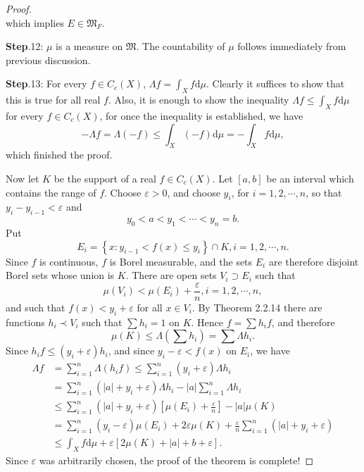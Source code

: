 \begin{proof}
$$$$
which implies $E\in\mathfrak{M}_F$.\par
\textbf{Step}.12: $\mu$ is a measure on $\mathfrak{M}$. The countability of $\mu$ follows immediately from previous discussion.\par
\textbf{Step}.13: For every $f\in C_c(X)$, $\Lambda f=\int_Xf\mathrm{d}\mu$. Clearly it suffices to show that this is true for all real $f$. Also, it is enough to show the inequality $\Lambda f\le\int_Xf\mathrm{d}\mu$ for every $f\in C_c(X)$, for once the inequality is established, we have 
$$
-\Lambda f=\Lambda \left( -f \right) \le \int_X{\left( -f \right) \mathrm{d}\mu}=-\int_X{f\mathrm{d}\mu},
$$
which finished the proof.\par
Now let $K$ be the support of a real $f\in C_c(X)$. Let $[a,b]$ be an interval which contains the range of $f$. Choose $\varepsilon>0$, and choose $y_i$, for $i=1,2,\cdots,n$, so that $y_i-y_{i-1}<\varepsilon$ and 
$$
y_0<a<y_1<\cdots <y_n=b.
$$
Put 
$$
E_i=\left\{ x:y_{i-1}<f\left( x \right) \le y_i \right\} \cap K,i=1,2,\cdots ,n.
$$
Since $f$ is continuous, $f$ is Borel measurable, and the sets $E_i$ are therefore disjoint Borel sets whose union is $K$. There are open sets $V_i\supset E_i$ such that 
$$
\mu \left( V_i \right) <\mu \left( E_i \right) +\frac{\varepsilon}{n},i=1,2,\cdots ,n,
$$
and such that $f(x)<y_i+\varepsilon$ for all $x\in V_i$. By Theorem 2.2.14 there are functions $h_i\prec V_i$ such that $\sum h_i=1$ on $K$. Hence $f=\sum h_if$, and therefore 
$$
\mu \left( K \right) \le \Lambda \left( \sum{h_i} \right) =\sum{\Lambda h_i}.
$$
Since $h_if\le(y_i+\varepsilon)h_i$, and since $y_i-\varepsilon<f(x)$ on $E_i$, we have 
$$
\begin{aligned}
\Lambda f&=\sum_{i=1}^n{\Lambda \left( h_if \right)}\le \sum_{i=1}^n{\left( y_i+\varepsilon \right) \Lambda h_i}
\\
&=\sum_{i=1}^n{\left( \left| a \right|+y_i+\varepsilon \right) \Lambda h_i}-\left| a \right|\sum_{i=1}^n{\Lambda h_i}
\\
&\le \sum_{i=1}^n{\left( \left| a \right|+y_i+\varepsilon \right) \left[ \mu \left( E_i \right) +\frac{\varepsilon}{n} \right]}-\left| a \right|\mu \left( K \right) 
\\
&=\sum_{i=1}^n{\left( y_i-\varepsilon \right) \mu \left( E_i \right)}+2\varepsilon \mu \left( K \right) +\frac{\varepsilon}{n}\sum_{i=1}^n{\left( \left| a \right|+y_i+\varepsilon \right)}
\\
&\le \int_X{f\mathrm{d}\mu}+\varepsilon \left[ 2\mu \left( K \right) +\left| a \right|+b+\varepsilon \right] .
\end{aligned}
$$
Since $\varepsilon$ was arbitrarily chosen, the proof of the theorem is complete!
\end{proof}
